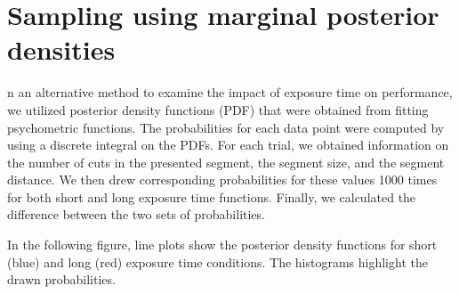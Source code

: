 \documentclass{article}
\begin{document}
\clearpage

\section{Sampling using marginal posterior densities}
n an alternative method to examine the impact of exposure time on performance, we utilized posterior density functions (PDF) that were obtained from fitting psychometric functions. The probabilities for each data point were computed by using a discrete integral on the PDFs. For each trial, we obtained information on the number of cuts in the presented segment, the segment size, and the segment distance. We then drew corresponding probabilities for these values 1000 times for both short and long exposure time functions. Finally, we calculated the difference between the two sets of probabilities.

In the following figure, line plots show the posterior density functions for short (blue) and long (red) exposure time conditions. The histograms highlight the drawn probabilities.

\clearpage
\end{document}
